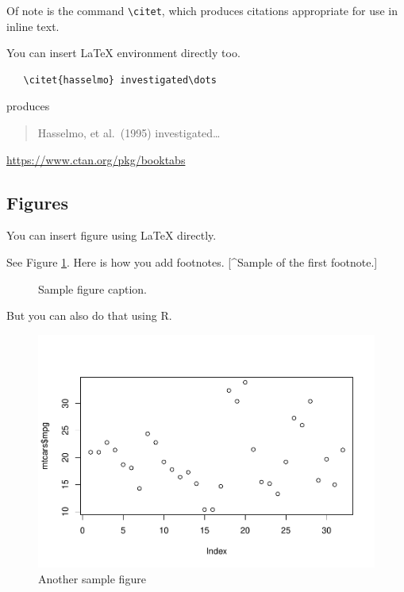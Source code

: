 \documentclass{article}
\newenvironment{Shaded}{\begin{snugshade}}{\end{snugshade}}
\newcommand{\FunctionTok}[1]{\textcolor[rgb]{0.13,0.29,0.53}{\textbf{#1}}}
\newcommand{\NormalTok}[1]{#1}
\newcommand{\SpecialCharTok}[1]{\textcolor[rgb]{0.81,0.36,0.00}{\textbf{#1}}}
\newcommand{\pandocbounded}[1]{#1}
\begin{document}
Of note is the command \verb+\citet+, which produces citations
appropriate for use in inline text.

You can insert LaTeX environment directly too.

\begin{verbatim}
   \citet{hasselmo} investigated\dots
\end{verbatim}

produces

\begin{quote}
  Hasselmo, et al.\ (1995) investigated\dots
\end{quote}

\begin{center}
  \url{https://www.ctan.org/pkg/booktabs}
\end{center}

\subsection{Figures}\label{figures}

You can insert figure using LaTeX directly.

See Figure \ref{fig:fig1}. Here is how you add footnotes. {[}\^{}Sample
of the first footnote.{]}

\begin{figure}
  \centering
  \fbox{\rule[-.5cm]{4cm}{4cm} \rule[-.5cm]{4cm}{0cm}}
  \caption{Sample figure caption.}
  \label{fig:fig1}
\end{figure}

But you can also do that using R.

\begin{Shaded}
\end{Shaded}

\begin{figure}
\centering
\pandocbounded{\includegraphics[keepaspectratio]{Final_Report_files/figure-latex/fig2-1.pdf}}
\caption{Another sample figure}
\end{figure}
\end{document}
